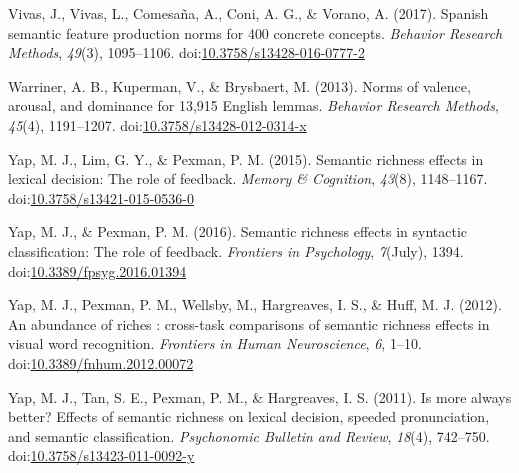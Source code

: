 \documentclass[english,,man]{apa6}
\theoremstyle{definition}
\theoremstyle{definition}
\theoremstyle{definition}
\theoremstyle{remark}
\begin{document}
\leavevmode\hypertarget{ref-Vivas2017}{}%
Vivas, J., Vivas, L., Comesaña, A., Coni, A. G., \& Vorano, A. (2017).
Spanish semantic feature production norms for 400 concrete concepts.
\emph{Behavior Research Methods}, \emph{49}(3), 1095--1106.
doi:\href{https://doi.org/10.3758/s13428-016-0777-2}{10.3758/s13428-016-0777-2}

\leavevmode\hypertarget{ref-Warriner2013}{}%
Warriner, A. B., Kuperman, V., \& Brysbaert, M. (2013). Norms of
valence, arousal, and dominance for 13,915 English lemmas.
\emph{Behavior Research Methods}, \emph{45}(4), 1191--1207.
doi:\href{https://doi.org/10.3758/s13428-012-0314-x}{10.3758/s13428-012-0314-x}

\leavevmode\hypertarget{ref-Yap2015}{}%
Yap, M. J., Lim, G. Y., \& Pexman, P. M. (2015). Semantic richness
effects in lexical decision: The role of feedback. \emph{Memory \&
Cognition}, \emph{43}(8), 1148--1167.
doi:\href{https://doi.org/10.3758/s13421-015-0536-0}{10.3758/s13421-015-0536-0}

\leavevmode\hypertarget{ref-Yap2016}{}%
Yap, M. J., \& Pexman, P. M. (2016). Semantic richness effects in
syntactic classification: The role of feedback. \emph{Frontiers in
Psychology}, \emph{7}(July), 1394.
doi:\href{https://doi.org/10.3389/fpsyg.2016.01394}{10.3389/fpsyg.2016.01394}

\leavevmode\hypertarget{ref-Yap2012}{}%
Yap, M. J., Pexman, P. M., Wellsby, M., Hargreaves, I. S., \& Huff, M.
J. (2012). An abundance of riches : cross-task comparisons of semantic
richness effects in visual word recognition. \emph{Frontiers in Human
Neuroscience}, \emph{6}, 1--10.
doi:\href{https://doi.org/10.3389/fnhum.2012.00072}{10.3389/fnhum.2012.00072}

\leavevmode\hypertarget{ref-Yap2011}{}%
Yap, M. J., Tan, S. E., Pexman, P. M., \& Hargreaves, I. S. (2011). Is
more always better? Effects of semantic richness on lexical decision,
speeded pronunciation, and semantic classification. \emph{Psychonomic
Bulletin and Review}, \emph{18}(4), 742--750.
doi:\href{https://doi.org/10.3758/s13423-011-0092-y}{10.3758/s13423-011-0092-y}
\end{document}
